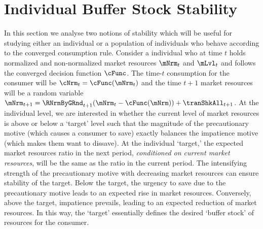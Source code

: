 \documentclass[BufferStockTheory]{subfiles}
\begin{document}

\hypertarget{Analysis of the Converged Consumption Function}{}
\section{Individual Buffer Stock Stability}\label{sec:individStability}

In this section we analyse two notions of stability which will be useful for studying either an individual or a population of individuals who behave according to the converged consumption rule.
Consider a individual who at time $t$ holds normalized and non-normalized market resources $\mNrm_{t}$ and $\mLvl_{t}$ and follows the converged decision function $\cFunc$.
The time-$t$ consumption for the consumer will be $\cNrm_{t} = \cFunc(\mNrm_{t})$ and the time $t+1$ market resources will be a random variable $\mNrm_{t+1} = \RNrmByGRnd_{t+1}(\mNrm_{t} - \cFunc(\mNrm)) + \tranShkAll_{t+1}$.
At the individual level, we are interested in whether the current level of market resources is above or below a `target' level such that the magnitude of the precautionary motive (which causes a consumer to save) exactly balances the impatience motive  (which makes them want to dissave).
At the individual `target,'  the expected market resources ratio in the next period, \textit{conditioned on current market resources}, will be the same as the ratio in the current period.
The intensifying strength of the precautionary motive with decreasing market resources can ensure stability of the target.
Below the target, the urgency to save due to the precautionary motive leads to an expected rise in market resources.
Conversely, above the target, impatience prevails, leading to an expected reduction of market resources.
In this way, the `target' essentially defines the desired `buffer stock' of resources for the consumer.
\end{document}
